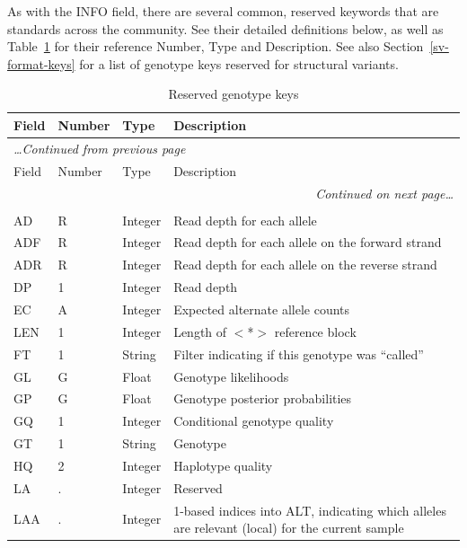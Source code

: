\documentclass[8pt]{article}
\begin{document}
As with the INFO field, there are several common, reserved keywords that are standards across the community.
See their detailed definitions below, as well as Table~\ref{table:reserved-genotypes} for their reference Number, Type and Description.
See also Section~\ref{sv-format-keys} for a list of genotype keys reserved for structural variants.

\begin{longtable}[c]{ | p{2.5cm} | p{1.5cm} | p{1.5cm} | p{10.3cm} | }
      \hline
      Field		& Number	& Type		& Description \\ \hline
  \endfirsthead
      \multicolumn{4}{l}{\small\emph{\ldots Continued from previous page}} \\[0.7ex]
      \hline
      Field		& Number	& Type		& Description \\ \hline
  \endhead
      \hline
      \multicolumn{4}{r}{\small\emph{Continued on next page\ldots}} \\
      \caption[]{Reserved genotype keys}
  \endfoot
      \hline
      \multicolumn{4}{l}{} \\
      \caption{Reserved genotype keys}
      \label{table:reserved-genotypes}
  \endlastfoot
      AD		& R			& Integer	& Read depth for each allele \\
      ADF		& R			& Integer	& Read depth for each allele on the forward strand \\
      ADR		& R			& Integer	& Read depth for each allele on the reverse strand \\
      DP		& 1			& Integer	& Read depth \\
      EC		& A			& Integer	& Expected alternate allele counts \\
      LEN		& 1			& Integer	& Length of $<$*$>$ reference block \\
      FT		& 1			& String	& Filter indicating if this genotype was ``called'' \\
      GL		& G			& Float		& Genotype likelihoods \\
      GP		& G			& Float		& Genotype posterior probabilities \\
      GQ		& 1			& Integer	& Conditional genotype quality \\
      GT		& 1			& String	& Genotype \\
      HQ		& 2			& Integer	& Haplotype quality \\
      LA		& .			& Integer	& Reserved \\
      LAA		& .			& Integer	& 1-based indices into ALT, indicating which alleles are relevant (local) for the current sample \\

\end{longtable}
\end{document}
